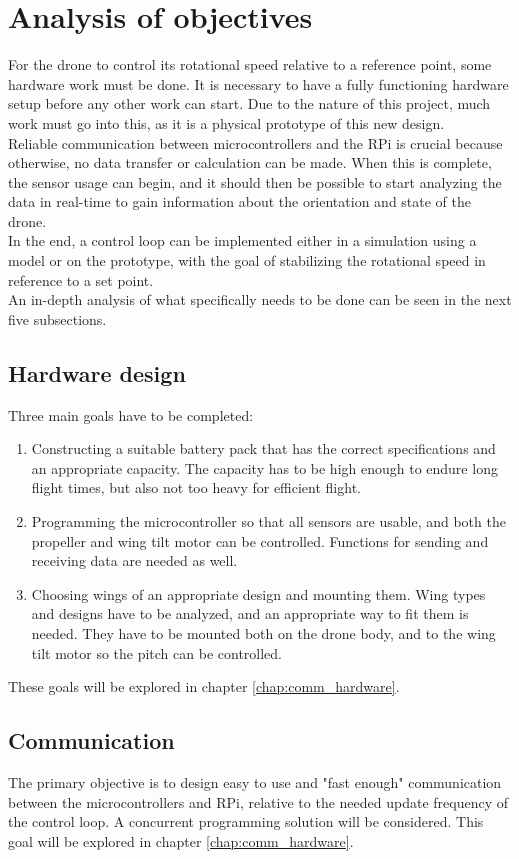 \section{Analysis of objectives}\label{analysisofgoals}
For the drone to control its rotational speed relative to a reference point, some hardware work must be done. It is necessary to have a fully functioning hardware setup before any other work can start. Due to the nature of this project, much work must go into this, as it is a physical prototype of this new design. \\
Reliable communication between microcontrollers and the RPi is crucial because otherwise, no data transfer or calculation can be made. When this is complete, the sensor usage can begin, and it should then be possible to start analyzing the data in real-time to gain information about the orientation and state of the drone.  \\
In the end, a control loop can be implemented either in a simulation using a model or on the prototype, with the goal of stabilizing the rotational speed in reference to a set point. \\
An in-depth analysis of what specifically needs to be done can be seen in the next five subsections.


\subsection{Hardware design}\label{hardwaregoals}
Three main goals have to be completed:
\begin{enumerate}
    \item Constructing a suitable battery pack that has the correct specifications and an appropriate capacity. The capacity has to be high enough to endure long flight times, but also not too heavy for efficient flight. 
    \item Programming the microcontroller so that all sensors are usable, and both the propeller and wing tilt motor can be controlled. Functions for sending and receiving data are needed as well.
    \item Choosing wings of an appropriate design and mounting them. Wing types and designs have to be analyzed, and an appropriate way to fit them is needed. They have to be mounted both on the drone body, and to the wing tilt motor so the pitch can be controlled. 
\end{enumerate}
These goals will be explored in chapter \ref{chap:comm_hardware}. 

\subsection{Communication}\label{commgoals}
The primary objective is to design easy to use and "fast enough" communication between the microcontrollers and RPi, relative to the needed update frequency of the control loop. A concurrent programming solution will be considered.
This goal will be explored in chapter \ref{chap:comm_hardware}.

